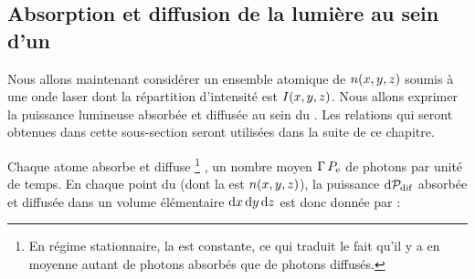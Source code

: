 \subsection{Absorption et diffusion de la lumière au sein d'un \nat} \label{sec:PuissanceDiffusee}
Nous allons maintenant considérer un ensemble atomique de \dat ${{n}(x,y,z)}$ soumis à une onde laser dont la répartition d'intensité est ${{I}(x,y,z)}$. 
Nous allons exprimer la puissance lumineuse absorbée et diffusée au sein du \n. Les relations qui seront obtenues dans cette sous-section seront utilisées dans la suite de ce chapitre.

Chaque atome absorbe et diffuse%
%
\footnote{En régime stationnaire, la \popuexcit est constante, ce qui traduit le fait qu'il y a en moyenne autant de photons absorbés que de photons diffusés.}%
,
 un nombre moyen ${\Gamma}\,{P_{\rm e}}$ de photons par unité de temps. En chaque point \xyz du \n (dont la \dat est ${{n}(x,y,z)}$), la puissance ${\mathrm{d} {\mathcal{P}_{\rm dif}}}$ absorbée et diffusée dans un volume élémentaire ${{{\mathrm{d} x}}\,{{\mathrm{d} y}}\,{{\mathrm{d} z}}}$ est donc donnée par %
 :



